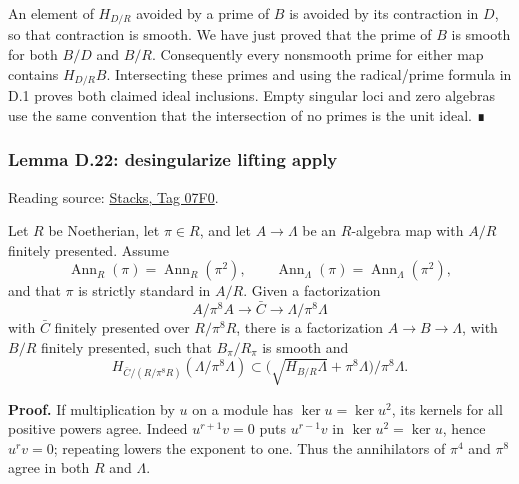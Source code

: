 \documentclass[11pt,a4paper,openany]{report}
\begin{document}
An element of \(H_{D/R}\) avoided by a prime of \(B\) is avoided by its contraction in \(D\), so that contraction is smooth. We have just proved that the prime of \(B\) is smooth for both \(B/D\) and \(B/R\). Consequently every nonsmooth prime for either map contains \(H_{D/R}B\). Intersecting these primes and using the radical/prime formula in D.1 proves both claimed ideal inclusions. Empty singular loci and zero algebras use the same convention that the intersection of no primes is the unit ideal. ∎

\label{AG-RG-S05-smoothing-lemma-desingularize-lifting-apply}

\subsubsection{Lemma D.22: desingularize lifting apply}\label{AG-RG-S05-lemma-d.22-desingularize-lifting-apply}

Reading source: \href{https://stacks.math.columbia.edu/tag/07F0}{Stacks, Tag 07F0}.

Let \(R\) be Noetherian, let \(\pi\in R\), and let \(A\to\Lambda\) be an \(R\)-algebra map with \(A/R\) finitely presented. Assume \[
\operatorname{Ann}_R(\pi)=\operatorname{Ann}_R(\pi^2),\qquad
\operatorname{Ann}_\Lambda(\pi)=\operatorname{Ann}_\Lambda(\pi^2),
\] and that \(\pi\) is strictly standard in \(A/R\). Given a factorization \[
A/\pi^8A\longrightarrow\bar C\longrightarrow\Lambda/\pi^8\Lambda
\] with \(\bar C\) finitely presented over \(R/\pi^8R\), there is a factorization \(A\to B\to\Lambda\), with \(B/R\) finitely presented, such that \(B_\pi/R_\pi\) is smooth and \[
H_{\bar C/(R/\pi^8R)}(\Lambda/\pi^8\Lambda)
\subset \bigl(\sqrt{H_{B/R}\Lambda}+\pi^8\Lambda\bigr)/\pi^8\Lambda.
\]

\textbf{Proof.} If multiplication by \(u\) on a module has \(\ker u=\ker u^2\), its kernels for all positive powers agree. Indeed \(u^{r+1}v=0\) puts \(u^{r-1}v\) in \(\ker u^2=\ker u\), hence \(u^rv=0\); repeating lowers the exponent to one. Thus the annihilators of \(\pi^4\) and \(\pi^8\) agree in both \(R\) and \(\Lambda\).
\end{document}
